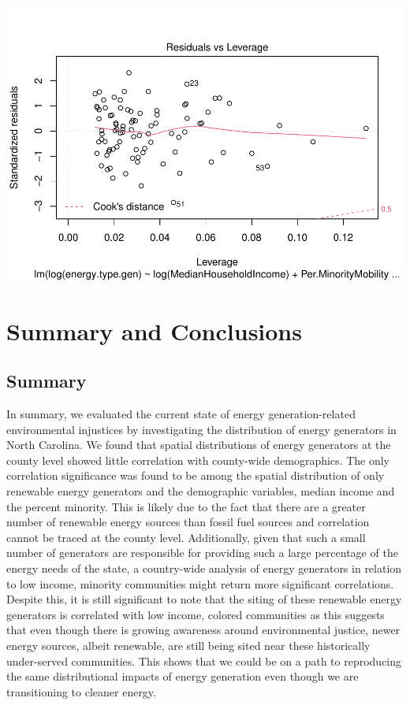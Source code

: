 \documentclass[
  12pt,
]{article}
\begin{document}
\includegraphics{Project_files/figure-latex/unnamed-chunk-6-4.pdf}

\newpage

\hypertarget{summary-and-conclusions}{%
\section{Summary and Conclusions}\label{summary-and-conclusions}}

\hypertarget{summary}{%
\subsection{Summary}\label{summary}}

In summary, we evaluated the current state of energy generation-related
environmental injustices by investigating the distribution of energy
generators in North Carolina. We found that spatial distributions of
energy generators at the county level showed little correlation with
county-wide demographics. The only correlation significance was found to
be among the spatial distribution of only renewable energy generators
and the demographic variables, median income and the percent minority.
This is likely due to the fact that there are a greater number of
renewable energy sources than fossil fuel sources and correlation cannot
be traced at the county level. Additionally, given that such a small
number of generators are responsible for providing such a large
percentage of the energy needs of the state, a country-wide analysis of
energy generators in relation to low income, minority communities might
return more significant correlations. Despite this, it is still
significant to note that the siting of these renewable energy generators
is correlated with low income, colored communities as this suggests that
even though there is growing awareness around environmental justice,
newer energy sources, albeit renewable, are still being sited near these
historically under-served communities. This shows that we could be on a
path to reproducing the same distributional impacts of energy generation
even though we are transitioning to cleaner energy.
\end{document}
